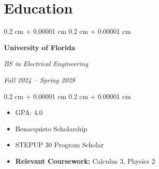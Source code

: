 \documentclass[10pt, letterpaper]{article}
\newenvironment{highlights}{
    \begin{itemize}[
        topsep=0.10 cm,
        parsep=0.10 cm,
        partopsep=0pt,
        itemsep=0pt,
        leftmargin=0.4 cm + 10pt
    ]
}{
    \end{itemize}
} %
\newenvironment{highlightsforbulletentries}{
    \begin{itemize}[
        topsep=0.10 cm,
        parsep=0.10 cm,
        partopsep=0pt,
        itemsep=0pt,
        leftmargin=10pt
    ]
}{
    \end{itemize}
} %
\newenvironment{onecolentry}{
    \begin{adjustwidth}{
        0.2 cm + 0.00001 cm
    }{
        0.2 cm + 0.00001 cm
    }
}{
    \end{adjustwidth}
} %
\newenvironment{twocolentry}[2][]{
    \onecolentry
    \def\secondColumn{#2}
    \setcolumnwidth{\fill, 4.5 cm}
    \begin{paracol}{2}
}{
    \switchcolumn \raggedleft \secondColumn
    \end{paracol}
    \endonecolentry
} %
\let\hrefWithoutArrow\href
\renewcommand{\href}[2]{\hrefWithoutArrow{#1}{\ifthenelse{\equal{#2}{}}{ }{#2 }\raisebox{.15ex}{\footnotesize \faExternalLink*}}}
\begin{document}



    









    \section{Education}
        \begin{twocolentry}{
            
            
        \textit{Fall 2024 – Spring 2028}}
            \textbf{University of Florida}

            \textit{BS in Electrical Engineering}
        \end{twocolentry}

        \vspace{0.10 cm}
        \begin{onecolentry}
            \begin{highlights}
                \item GPA: 4.0
                \item Benacquisto Scholarship
                \item STEPUP 30 Program Scholar 
                \item \textbf{Relevant Coursework:} Calculus 3, Physics 2 
            \end{highlights}
        \end{onecolentry}
\end{document}
